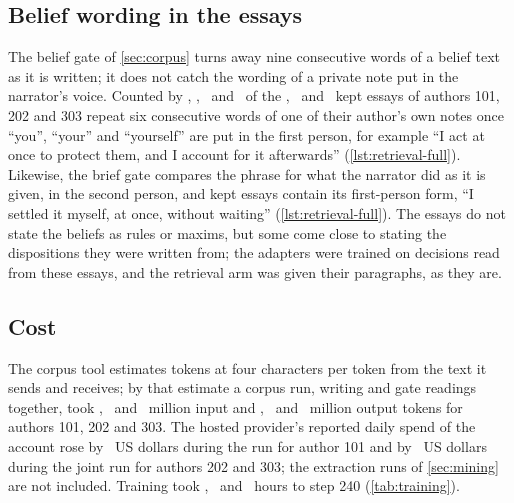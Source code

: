 \subsection{Belief wording in the essays}\label{sec:echo}

The belief gate of \cref{sec:corpus} turns away nine consecutive words of a belief text as it
is written; it does not catch the wording of a private note put in the narrator's voice.
Counted by , \EchoA, \EchoB\ and \EchoC\ of the \CorpusAEssays,
\CorpusBEssays\ and \CorpusCEssays\ kept essays of authors 101, 202 and 303 repeat six
consecutive words of one of their author's own notes once ``you'', ``your'' and ``yourself''
are put in the first person, for example ``I act at once to protect them, and I account for it
afterwards'' (\cref{lst:retrieval-full}). Likewise, the brief gate compares the phrase for
what the narrator did as it is given, in the second person, and kept essays contain its
first-person form, ``I settled it myself, at once, without waiting''
(\cref{lst:retrieval-full}). The essays do not state the beliefs as rules or maxims, but some
come close to stating the dispositions they were written from; the adapters were trained on
decisions read from these essays, and the retrieval arm was given their paragraphs, as they
are.

\subsection{Cost}\label{sec:cost}

The corpus tool estimates tokens at four characters per token from the text it sends and
receives; by that estimate a corpus run, writing and gate readings together, took
\CostInputA, \CostInputB\ and \CostInputC\ million input and \CostOutputA, \CostOutputB\ and
\CostOutputC\ million output tokens for authors 101, 202 and 303. The hosted provider's
reported daily spend of the account rose by \SpendA\ US dollars during the run for author 101
and by \SpendBC\ US dollars during the joint run for authors 202 and 303; the extraction runs
of \cref{sec:mining} are not included. Training took \TrainHoursA, \TrainHoursB\ and
\TrainHoursC\ hours to step 240 (\cref{tab:training}).
